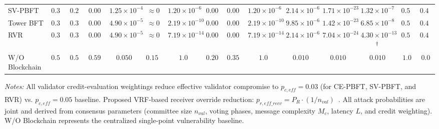 \begin{table}[t]
\begin{tabular}{@{}l|cccccccccccc|cc@{}}
SV-PBFT & $0.337$ & $0.251$ & $0.0011$ & $1.25{\times}10^{-4}$ & $\approx 0$ & $1.20{\times}10^{-6}$ & $0.0031$ & $0.0054$ & $1.20{\times}10^{-6}$ & $2.14{\times}10^{-6}$ & $1.71{\times}10^{-23}$ & $1.32{\times}10^{-7}$ & \textbf{$0.509$} & \textbf{$0.491$} \\
Tower BFT & $0.305$ & $0.323$ & $0.0011$ & $4.90{\times}10^{-5}$ & $\approx 0$ & $2.19{\times}10^{-10}$ & $0.0016$ & $0.0029$ & $2.19{\times}10^{-10}$ & $9.85{\times}10^{-6}$ & $1.42{\times}10^{-23}$ & $6.85{\times}10^{-8}$ & \textbf{$0.532$} & \textbf{$0.468$} \\
RVR & $0.305$ & $0.323$ & $0.0011$ & $4.90{\times}10^{-5}$ & $\approx 0$ & $7.19{\times}10^{-14}$ & $0.0013$ & $0.0023$ & $7.19{\times}10^{-14}$ & $2.14{\times}10^{-6}$ & $7.04{\times}10^{-24}$ & $4.30{\times}10^{-13}$$\textsuperscript{\textdagger}$ & \textbf{$0.531$} & \textbf{$0.469$} \\
\midrule
W/O Blockchain & $0.599$ & $0.599$ & $0.599$ & $0.050$ & $0.150$ & $1.0$ & $0.200$ & $0.350$ & $1.0$ & $0.010$ & $0.010$ & $0.010$ & \textbf{$1.0$} & \textbf{$0.0$} \\
\bottomrule
\end{tabular}
\vspace{2pt}
\par\noindent\scriptsize\textit{Notes:} All validator credit-evaluation weightings reduce effective validator compromise to $p_{c,eff} = 0.03$ (for CE-PBFT, SV-PBFT, and RVR) vs. $p_{c,eff} = 0.05$ baseline. \textsuperscript{\textdagger}Proposed VRF-based receiver override reduction: $p_{r,eff\_recv} = P_R \cdot (1/n_{val})$~\cite{wang2025}. All attack probabilities are joint and derived from consensus parameters (committee size $n_{val}$, voting phases, message complexity $M_c$, latency $L$, and credit weighting). W/O Blockchain represents the centralized single-point vulnerability baseline.
\end{table}